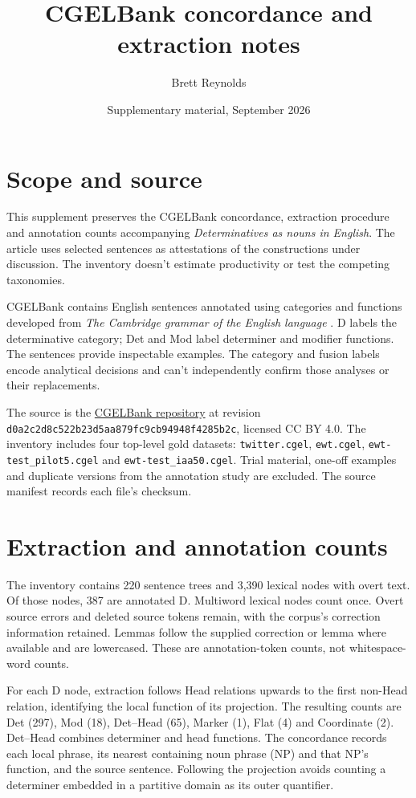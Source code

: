 \documentclass[12pt]{article}
\title{CGELBank concordance and extraction notes}
\author{Brett Reynolds}
\date{Supplementary material, September 2026}
\begin{document}
\maketitle

\section{Scope and source}

This supplement preserves the CGELBank concordance, extraction procedure and annotation counts accompanying \textit{Determinatives as nouns in English}. The article uses selected sentences as attestations of the constructions under discussion. The inventory doesn't estimate productivity or test the competing taxonomies.

CGELBank contains English sentences annotated using categories and functions developed from \textit{The Cambridge grammar of the English language} \citep{reynolds2023unified}. D labels the determinative category; Det and Mod label determiner and modifier functions. The sentences provide inspectable examples. The category and fusion labels encode analytical decisions and can't independently confirm those analyses or their replacements.

The source is the \href{https://github.com/nert-nlp/cgel/tree/d0a2c2d8c522b23d5aa879fc9cb94948f4285b2c}{CGELBank repository} at revision \nolinkurl{d0a2c2d8c522b23d5aa879fc9cb94948f4285b2c}, licensed CC BY 4.0. The inventory includes four top-level gold datasets: \nolinkurl{twitter.cgel}, \nolinkurl{ewt.cgel}, \nolinkurl{ewt-test_pilot5.cgel} and \nolinkurl{ewt-test_iaa50.cgel}. Trial material, one-off examples and duplicate versions from the annotation study are excluded. The source manifest records each file's checksum.

\section{Extraction and annotation counts}

The inventory contains 220 sentence trees and 3,390 lexical nodes with overt text. Of those nodes, 387 are annotated D. Multiword lexical nodes count once. Overt source errors and deleted source tokens remain, with the corpus's correction information retained. Lemmas follow the supplied correction or lemma where available and are lowercased. These are annotation-token counts, not whitespace-word counts.

For each D node, extraction follows Head relations upwards to the first non-Head relation, identifying the local function of its projection. The resulting counts are Det (297), Mod (18), Det--Head (65), Marker (1), Flat (4) and Coordinate (2). Det--Head combines determiner and head functions. The concordance records each local phrase, its nearest containing noun phrase (NP) and that NP's function, and the source sentence. Following the projection avoids counting a determiner embedded in a partitive domain as its outer quantifier.
\end{document}
